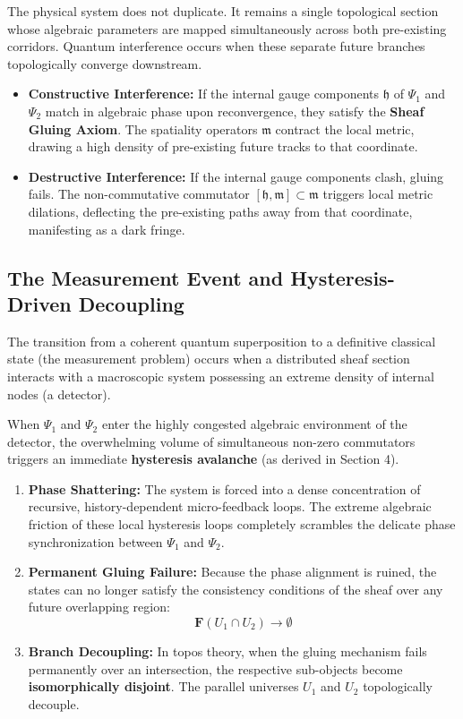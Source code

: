 \documentclass[12pt,letterpaper]{article}
\begin{document}
The physical system does not duplicate. It remains a single topological section whose algebraic parameters are mapped simultaneously across both pre-existing corridors. Quantum interference occurs when these separate future branches topologically converge downstream.
\begin{itemize}
    \item \textbf{Constructive Interference:} If the internal gauge components $\mathfrak{h}$ of $\Psi_1$ and $\Psi_2$ match in algebraic phase upon reconvergence, they satisfy the \textbf{Sheaf Gluing Axiom}. The spatiality operators $\mathfrak{m}$ contract the local metric, drawing a high density of pre-existing future tracks to that coordinate.
    \item \textbf{Destructive Interference:} If the internal gauge components clash, gluing fails. The non-commutative commutator $[\mathfrak{h}, \mathfrak{m}] \subset \mathfrak{m}$ triggers local metric dilations, deflecting the pre-existing paths away from that coordinate, manifesting as a dark fringe.
\end{itemize}

\subsection{The Measurement Event and Hysteresis-Driven Decoupling}
The transition from a coherent quantum superposition to a definitive classical state (the measurement problem) occurs when a distributed sheaf section interacts with a macroscopic system possessing an extreme density of internal nodes (a detector).

When $\Psi_1$ and $\Psi_2$ enter the highly congested algebraic environment of the detector, the overwhelming volume of simultaneous non-zero commutators triggers an immediate \textbf{hysteresis avalanche} (as derived in Section 4).
\begin{enumerate}
    \item \textbf{Phase Shattering:} The system is forced into a dense concentration of recursive, history-dependent micro-feedback loops. The extreme algebraic friction of these local hysteresis loops completely scrambles the delicate phase synchronization between $\Psi_1$ and $\Psi_2$.
    \item \textbf{Permanent Gluing Failure:} Because the phase alignment is ruined, the states can no longer satisfy the consistency conditions of the sheaf over any future overlapping region:
    $$\mathbf{F}(U_1 \cap U_2) \to \emptyset$$
    \item \textbf{Branch Decoupling:} In topos theory, when the gluing mechanism fails permanently over an intersection, the respective sub-objects become \textbf{isomorphically disjoint}. The parallel universes $U_1$ and $U_2$ topologically decouple.
\end{enumerate}
\end{document}
